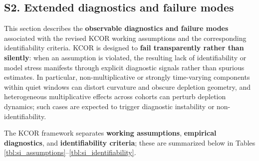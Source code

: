 \documentclass[
]{article}
\begin{document}
\subsection{S2. Extended diagnostics and failure
modes}\label{s2.-extended-diagnostics-and-failure-modes}

This section describes the \textbf{observable diagnostics and failure
modes} associated with the revised KCOR working assumptions and the
corresponding identifiability criteria. KCOR is designed to \textbf{fail
transparently rather than silently}: when an assumption is violated, the
resulting lack of identifiability or model stress manifests through
explicit diagnostic signals rather than spurious estimates. In
particular, non-multiplicative or strongly time-varying components
within quiet windows can distort curvature and obscure depletion
geometry, and heterogeneous multiplicative effects across cohorts can
perturb depletion dynamics; such cases are expected to trigger
diagnostic instability or non-identifiability.

The KCOR framework separates \textbf{working assumptions},
\textbf{empirical diagnostics}, and \textbf{identifiability criteria};
these are summarized below in Tables
\ref{tbl:si_assumptions}--\ref{tbl:si_identifiability}.
\end{document}
